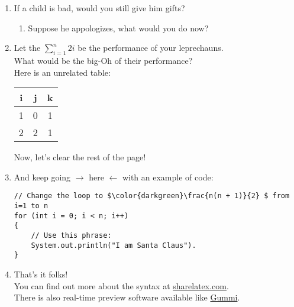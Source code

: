\documentclass[12pt]{article}
\begin{document}
    \begin{enumerate}
    
    \item If a child is bad, would you still give him gifts?
    
        \begin{enumerate}
        
        \item Suppose he appologizes, what would you do now?\\
        
        \end{enumerate}  
        
    \item Let the $\sum_{i=1}^{n}2i$ be the performance of your leprechauns.\\
    
    What would be the big-Oh of their performance?\\
    
    Here is an unrelated table:
    
    \begin{center}
        \begin{tabular}{|c|c|c|}
            \hline
            i & j & k\\
            \hline
            1 & 0 & 1\\
            2 & 2 & 1\\
            \hline
        \end{tabular}
        \newline
    \end{center}
    
    Now, let's clear the rest of the page!\clearpage
    
    \item And keep going $\rightarrow$ here $\leftarrow$ with an example of code:\\
    
\begin{lstlisting}[mathescape]
// Change the loop to $\color{darkgreen}\frac{n(n + 1)}{2} $ from i=1 to n
for (int i = 0; i < n; i++)
{
    // Use this phrase:
    System.out.println("I am Santa Claus").
}
\end{lstlisting}

    
    \item That's it folks!\\
    
    You can find out more about the syntax at \href{https://www.sharelatex.com/learn/List_of_Greek_letters_and_math_symbols}{sharelatex.com}.\\
    
    There is also real-time preview software available like \href{https://github.com/alexandervdm/gummi}{Gummi}.
    
    \end{enumerate}
    
\end{document}
